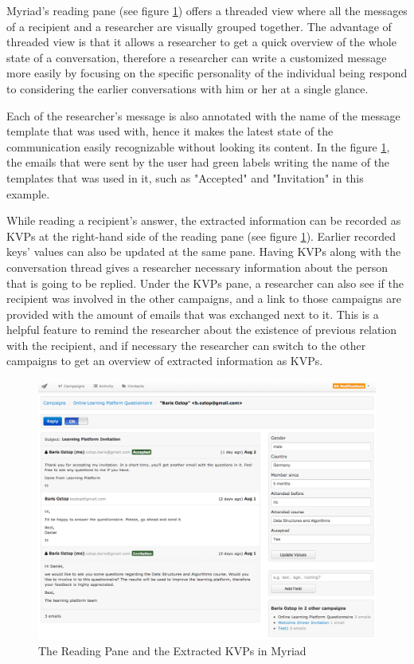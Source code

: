 Myriad's reading pane (see figure \ref{fig:MyriadReadingPane}) offers a threaded view where all the messages of a recipient and a researcher are visually grouped together. The advantage of threaded view is that it allows a researcher to get a quick overview of the whole state of a conversation, therefore a researcher can write a customized message more easily by focusing on the specific personality of the individual being respond to considering the earlier conversations with him or her at a single glance.
\vspace{1cm}

Each of the researcher's message is also annotated with the name of the message template that was used with, hence it makes the latest state of the communication easily recognizable without looking its content. In the figure \ref{fig:MyriadReadingPane}, the emails that were sent by the user had green labels writing the name of the templates that was used in it, such as "Accepted" and "Invitation" in this example.
\vspace{1cm}

While reading a recipient's answer, the extracted information can be recorded as \ac{KVP}s at the right-hand side of the reading pane (see figure \ref{fig:MyriadReadingPane}). Earlier recorded keys' values can also be updated at the same pane. Having \ac{KVP}s along with the conversation thread gives a researcher necessary information about the person that is going to be replied. Under the \ac{KVP}s pane, a researcher can also see if the recipient was involved in the other campaigns, and a link to those campaigns are provided with the amount of emails that was exchanged next to it. This is a helpful feature to remind the researcher about the existence of previous relation with the recipient, and if necessary the researcher can switch to the other campaigns to get an overview of extracted information as \ac{KVP}s.

\begin{figure}[htbp]
	\centering
	\includegraphics[width=1.00\textwidth]{imgs/MyriadReadingPane.png}
	\caption[The Reading Pane and the Extracted \ac{KVP}s in Myriad]{The Reading Pane and the Extracted \ac{KVP}s in Myriad}
	\label{fig:MyriadReadingPane}
\end{figure}

